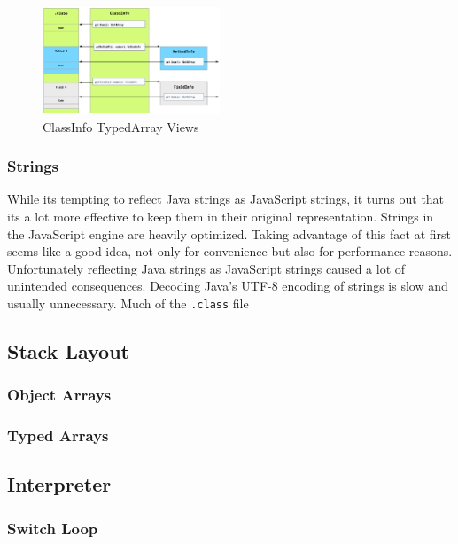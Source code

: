 \documentclass{acm_proc_article-sp}
\begin{document}
\begin{figure}[htbp]
\begin{center}
\includegraphics[width=200px]{classInfo.pdf}
\caption{ClassInfo TypedArray Views}
\label{default}
\end{center}
\end{figure}

\subsubsection{Strings}

While its tempting to reflect Java strings as JavaScript strings, it turns out that its a lot more effective to keep them in their original representation.
Strings in the JavaScript engine are heavily optimized. Taking advantage of this fact at first seems like a good idea, not only for convenience but also for performance reasons.
Unfortunately reflecting Java strings as JavaScript strings caused a lot of unintended consequences.
Decoding Java's UTF-8 encoding of strings is slow and usually unnecessary. Much of the \texttt{.class} file 


\subsection{Stack Layout}

\subsubsection{Object Arrays}

\subsubsection{Typed Arrays}

\subsection{Interpreter}

\subsubsection{Switch Loop}
\end{document}
